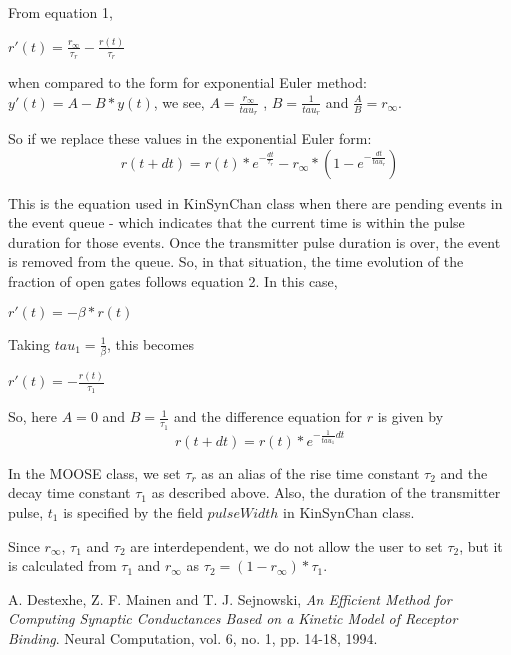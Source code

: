 \documentclass[11pt]{article}
\begin{document}
From equation 1, 
\begin{center}
  $r'(t) = \frac{r_{\infty}}{\tau_{r}} - \frac{r(t)}{\tau_{r}}$
\end{center}
when compared to the form for exponential Euler method: $y'(t) = A - B
* y(t)$, we see, $A = \frac{r_{\infty}}{tau_{r}}$ , $B =
\frac{1}{tau_{r}}$ and $\frac{A}{B} = r_{\infty}$.

So if we replace these values in the exponential Euler form:
\begin{equation}
  r(t+dt) = r(t) * e^{-\frac{dt}{\tau_{r}}} - r_{\infty} * ( 1 - e^{-\frac{dt}{tau_{r}}})
\end{equation}

This is the equation used in KinSynChan class when there are pending
events in the event queue - which indicates that the current time is
within the pulse duration for those events. Once the transmitter
pulse duration is over, the event is removed from the queue. So, in
that situation, the time evolution of the fraction of open gates
follows equation 2. In this case,
\begin{center}
$r'(t) = - \beta * r(t)$
\end{center}
Taking $tau_{1} = \frac{1}{\beta}$, this becomes
\begin{center}
$r'(t) = - \frac{r(t)}{\tau_{1}}$
\end{center}
So, here $A = 0$ and $B = \frac{1}{\tau_{1}}$ and the difference
equation for $r$ is given by
\begin{equation}
r(t+dt) = r(t) * e^{-\frac{1}{tau_{1}} dt}
\end{equation}

In the MOOSE class, we set $\tau_{r}$ as an alias of the rise time
constant $\tau_{2}$ and the decay time constant $\tau_{1}$ as
described above. Also, the duration of the transmitter pulse, $t_{1}$
is specified by the field $pulseWidth$ in KinSynChan class.

Since $r_{\infty}$, $\tau_{1}$ and $\tau_{2}$ are interdependent, we
do not allow the user to set $\tau_{2}$, but it is calculated from
$\tau_{1}$ and $r_{\infty}$ as $\tau_{2} = ( 1 - r_{\infty}) * \tau_{1}$.


\begin{thebibliography}{2}
  A. Destexhe, Z. F. Mainen and
    T. J. Sejnowski, \emph{An Efficient Method for Computing Synaptic
      Conductances Based on a Kinetic Model of Receptor
      Binding}. Neural Computation, vol. 6, no. 1, pp. 14-18, 1994.
\end{thebibliography}
\end{document}

